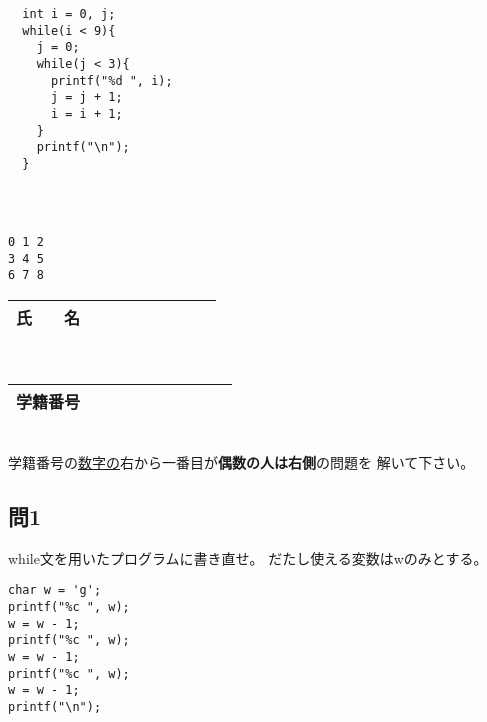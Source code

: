 \documentclass[a4j]{jarticle}
\def\ans#1#2{
\ifnum \anss=1
#1
\else
#2
\fi
}
\begin{document}
\begin{multicols*}{2}
\begin{verbatim}
  int i = 0, j;
  while(i < 9){
    j = 0;
    while(j < 3){
      printf("%d ", i);
      j = j + 1;
      i = i + 1;
    }
    printf("\n");
  }
\end{verbatim}


\ifnum {}
\begin{verbatim}



\end{verbatim}
\else
\begin{verbatim}
0 1 2
3 4 5
6 7 8
\end{verbatim}
\fi


%






\vfill

\mbox{}





\noindent
\begin{tabular}[t]{|c|cccccccc|}\hline
氏　　名 & & & & & & & & \\ \hline
\end{tabular}\\
\begin{tabular}[t]{|c|c|c|c|c|c|c|c|c|c|}\hline
学籍番号 & & & & & & & & \\ \hline
\end{tabular}\\
学籍番号の\underline{数字の}右から一番目が{\bfseries 偶数の人は右側}の問題を
解いて下さい。
\vspace{-5ex}






\subsection*{問1}

{\ttfamily while}文を用いたプログラムに書き直せ。
だたし使える変数は{\ttfamily w}のみとする。

\begin{verbatim}
char w = 'g';
printf("%c ", w);
w = w - 1;
printf("%c ", w);
w = w - 1;
printf("%c ", w);
w = w - 1;
printf("\n");
\end{verbatim}


\end{multicols*}
\end{document}
